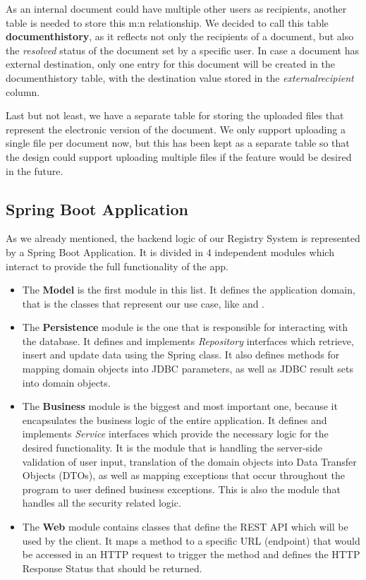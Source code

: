 As an internal document could have multiple other users as recipients, another table is needed to store this m:n relationship. We decided to call this table \textbf{documenthistory}, as it reflects not only the recipients of a document, but also the \textit{resolved} status of the document set by a specific user. In case a document has external destination, only one entry for this document will be created in the documenthistory table, with the destination value stored in the \textit{externalrecipient} column.

Last but not least, we have a separate table for storing the uploaded files that represent the electronic version of the document. We only support uploading a single file per document now, but this has been kept as a separate table so that the design could support uploading multiple files if the feature would be desired in the future.



\subsection{Spring Boot Application}
\label{subsection:springBootApplication}

As we already mentioned, the backend logic of our Registry System is represented by a Spring Boot Application. It is divided in 4 independent modules which interact to provide the full functionality of the app.

\begin{itemize}
    \item The \textbf{Model} is the first module in this list. It defines the application domain, that is the classes that represent our use case, like  and .
    \item The \textbf{Persistence} module is the one that is responsible for interacting with the database. It defines and implements \textit{Repository} interfaces which retrieve, insert and update data using the Spring  class. It also defines methods for mapping domain objects into JDBC parameters, as well as JDBC result sets into domain objects.
    \item The \textbf{Business} module is the biggest and most important one, because it encapsulates the business logic of the entire application. It defines and implements \textit{Service} interfaces which provide the necessary logic for the desired functionality. It is the module that is handling the server-side validation of user input, translation of the domain objects into Data Transfer Objects (DTOs), as well as mapping exceptions that occur throughout the program to user defined business exceptions. This is also the module that handles all the security related logic.
    \item The \textbf{Web} module contains  classes that define the REST API which will be used by the client. It maps a method to a specific URL (endpoint) that would be accessed in an HTTP request to trigger the method and defines the HTTP Response Status that should be returned.
\end{itemize}

